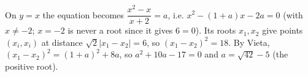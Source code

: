 On $y=x$ the equation becomes $\dfrac{x^2-x}{x+2}=a$, i.e. $x^2-(1+a)x-2a=0$ (with $x\ne-2$; $x=-2$ is never a root since it gives $6=0$). Its roots $x_1,x_2$ give points $(x_i,x_i)$ at distance $\sqrt2|x_1-x_2|=6$, so $(x_1-x_2)^2=18$. By Vieta, $(x_1-x_2)^2=(1+a)^2+8a$, so $a^2+10a-17=0$ and $a=\boxed{\sqrt{42}-5}$ (the positive root).
